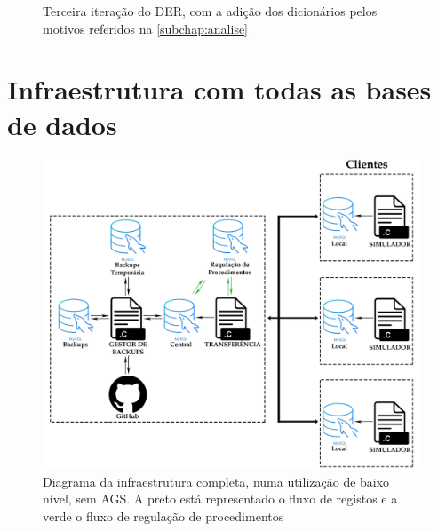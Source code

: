 \documentclass[11pt,twoside,a4paper]{report}
\begin{document}
\begin{landscape}
\begin{figure}
\begin{center}
		\caption[Terceira iteração do Diagrama Entidade/Relação]{Terceira iteração do DER, com a adição dos dicionários pelos motivos referidos na \autoref{subchap:analise}}
		\label{fig:evolucao_der3}
	\end{center}
\end{figure}
\end{landscape}

\cleardoublepage
\chapter{Infraestrutura com todas as bases de dados}
\label{apen:infra}
\begin{figure}[H]
	\begin{center}
		\includegraphics[width=1\textwidth]{Esquema_Projeto_Total01} %
		\caption[Diagrama da infraestrutura completa sem aplicação de gestão do sistema]{Diagrama da infraestrutura completa, numa utilização de baixo nível, sem AGS. A preto está representado o fluxo de registos e a verde o fluxo de regulação de procedimentos}
		\label{fig:infra_total1}
	\end{center}
\end{figure}
\end{document}
